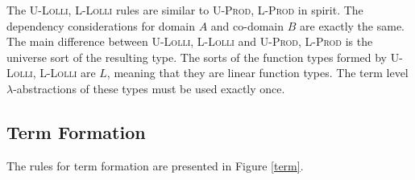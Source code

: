\documentclass{article}
\theoremstyle{definition}
\newcommand{\rname}[1]{\textsc{\footnotesize #1}}
\begin{document}
  The \rname{U-Lolli}, \rname{L-Lolli} rules are similar to \rname{U-Prod}, \rname{L-Prod} in spirit. The dependency considerations for domain $A$ and co-domain $B$ are exactly the same. The main difference between \rname{U-Lolli}, \rname{L-Lolli} and \rname{U-Prod}, \rname{L-Prod} is the universe sort of the resulting type. The sorts of the function types formed by \rname{U-Lolli}, \rname{L-Lolli} are $L$, meaning that they are linear function types. The term level $\lambda$-abstractions of these types must be used exactly once.

  \subsection{Term Formation} \label{teformation}
  The rules for term formation are presented in Figure \ref{term}.
\end{document}
